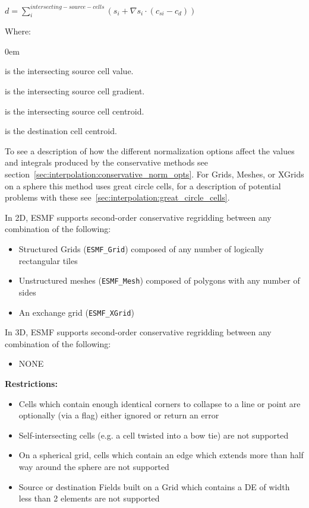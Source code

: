  $d=\sum^{intersecting-source-cells}_{i}(s_{i}+\nabla s_{i} \cdot (c_{si}-c_{d}))$

\smallskip

Where:
\vspace{-1em}
\begin{description}
  \itemsep0em
  \item[$s_{i}$] is the intersecting source cell value. 
  \item[$\nabla s_{i}$] is the intersecting source cell gradient. 
  \item[$c_{si}$] is the intersecting source cell centroid. 
  \item[$c_{d}$] is the destination cell centroid. 
\end{description}

\smallskip

 To see a description of how the different normalization options affect the values and integrals produced by the conservative methods see section~\ref{sec:interpolation:conservative_norm_opts}. For Grids, Meshes, or XGrids on a sphere this method uses great circle cells, for a description of potential problems with these see~\ref{sec:interpolation:great_circle_cells}.


\smallskip

 In 2D, ESMF supports second-order conservative regridding between any combination of the following:
 \begin{itemize}
 \item Structured Grids ({\tt ESMF\_Grid}) composed of any number of logically rectangular tiles
 \item Unstructured meshes ({\tt ESMF\_Mesh}) composed of polygons with any number of sides
 \item An exchange grid ({\tt ESMF\_XGrid})
 \end{itemize}

\smallskip

 In 3D, ESMF supports second-order conservative regridding between any combination of the following:
 \begin{itemize}
 \item NONE
 \end{itemize}

\smallskip

{\bf Restrictions:}
 \begin{itemize}
 \item Cells which contain enough identical corners to collapse to a line or point are optionally (via a flag) either ignored or return an error
 \item Self-intersecting cells (e.g. a cell twisted into a bow tie) are not supported
 \item On a spherical grid, cells which contain an edge which extends more than half way around the sphere are not supported 
 \item Source or destination Fields built on a Grid which contains a DE of width less than 2 elements are not supported
 \end{itemize}
 
